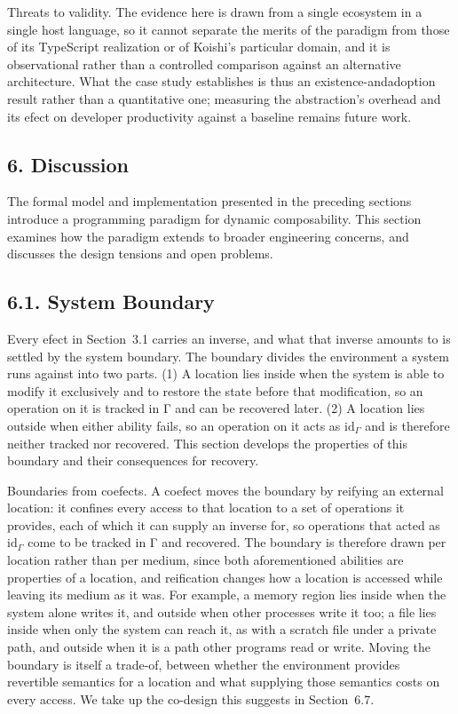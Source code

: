 \documentclass[
  10
]{article}
\begin{document}
Threats to validity. The evidence here is drawn from a single ecosystem
in a single host language, so it cannot separate the merits of the
paradigm from those of its TypeScript realization or of Koishi's
particular domain, and it is observational rather than a controlled
comparison against an alternative architecture. What the case study
establishes is thus an existence-andadoption result rather than a
quantitative one; measuring the abstraction's overhead and its efect on
developer productivity against a baseline remains future work.

\subsection{6. Discussion}\label{discussion}

The formal model and implementation presented in the preceding sections
introduce a programming paradigm for dynamic composability. This section
examines how the paradigm extends to broader engineering concerns, and
discusses the design tensions and open problems.

\subsection{6.1. System Boundary}\label{system-boundary}

Every efect in Section~3.1 carries an inverse, and what that inverse
amounts to is settled by the system boundary. The boundary divides the
environment a system runs against into two parts. (1) A location lies
inside when the system is able to modify it exclusively and to restore
the state before that modification, so an operation on it is tracked in
Γ and can be recovered later. (2) A location lies outside when either
ability fails, so an operation on it acts as
\(\mathrm { i d } _ { \Gamma }\) and is therefore neither tracked nor
recovered. This section develops the properties of this boundary and
their consequences for recovery.

Boundaries from coefects. A coefect moves the boundary by reifying an
external location: it confines every access to that location to a set of
operations it provides, each of which it can supply an inverse for, so
operations that acted as \(\mathrm { i d } _ { \Gamma }\) come to be
tracked in Γ and recovered. The boundary is therefore drawn per location
rather than per medium, since both aforementioned abilities are
properties of a location, and reification changes how a location is
accessed while leaving its medium as it was. For example, a memory
region lies inside when the system alone writes it, and outside when
other processes write it too; a file lies inside when only the system
can reach it, as with a scratch file under a private path, and outside
when it is a path other programs read or write. Moving the boundary is
itself a trade-of, between whether the environment provides revertible
semantics for a location and what supplying those semantics costs on
every access. We take up the co-design this suggests in Section~6.7.
\end{document}
